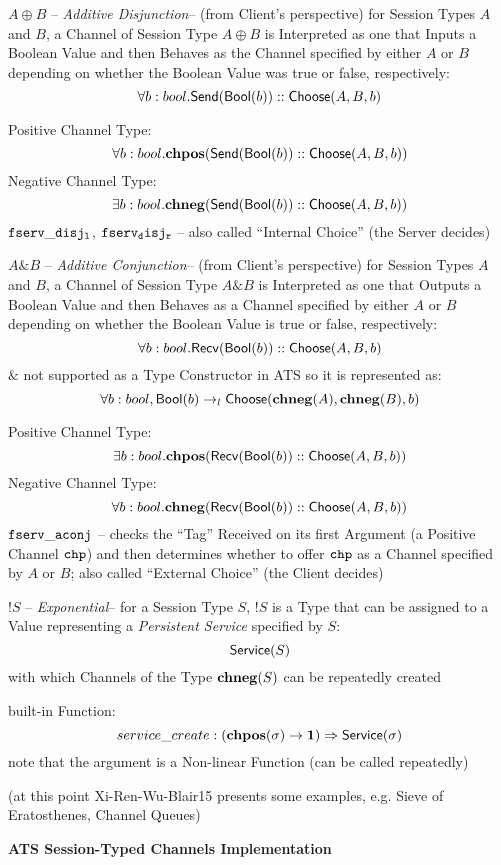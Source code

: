 $A \oplus B$ -- \emph{Additive Disjunction}-- (from Client's
perspective) for Session Types $A$ and $B$, a Channel of Session Type
$A \oplus B$ is Interpreted as one that Inputs a Boolean Value and
then Behaves as the Channel specified by either $A$ or $B$ depending
on whether the Boolean Value was true or false, respectively:
\[
  \forall b : bool. \mathsf{Send}(\mathsf{Bool}(b)) :: \mathsf{Choose}(A,B,b)
\]

Positive Channel Type:
\[
  \forall b : bool. \mathbf{chpos}(\mathsf{Send}(\mathsf{Bool}(b)) :: \mathsf{Choose}(A,B,b))
\]
Negative Channel Type:
\[
  \exists b : bool. \mathbf{chneg}(\mathsf{Send}(\mathsf{Bool}(b)) :: \mathsf{Choose}(A,B,b))
\]
$\mathtt{fserv\_disj_l}$, $\mathtt{fserv_disj_r}$ -- also called ``Internal
Choice'' (the Server decides)

$A \& B$ -- \emph{Additive Conjunction}-- (from Client's perspective)
for Session Types $A$ and $B$, a Channel of Session Type $A \& B$ is
Interpreted as one that Outputs a Boolean Value and then Behaves as a
Channel specified by either $A$ or $B$ depending on whether the
Boolean Value is true or false, respectively:
\[
  \forall b : bool. \mathsf{Recv}(\mathsf{Bool}(b)) :: \mathsf{Choose}(A,B,b)
\]
$\&$ not supported as a Type Constructor in ATS so it is represented
as:
\[
  \forall b:bool,
    \mathsf{Bool}(b) \rightarrow_l \mathsf{Choose}(\mathbf{chneg}(A), \mathbf{chneg}(B), b)
\]

Positive Channel Type:
\[
  \exists b : bool. \mathbf{chpos}(\mathsf{Recv}(\mathsf{Bool}(b)) :: \mathsf{Choose}(A,B,b))
\]
Negative Channel Type:
\[
  \forall b : bool. \mathbf{chneg}(\mathsf{Recv}(\mathsf{Bool}(b)) :: \mathsf{Choose}(A,B,b))
\]
$\mathtt{fserv\_aconj}$ -- checks the ``Tag'' Received on its first
Argument (a Positive Channel $\mathtt{chp}$) and then determines whether
to offer $\mathtt{chp}$ as a Channel specified by $A$ or $B$; also
called ``External Choice'' (the Client decides)

$!S$ -- \emph{Exponential}-- for a Session Type $S$, $!S$ is a Type
that can be assigned to a Value representing a \emph{Persistent
  Service} specified by $S$:
\[
  \mathsf{Service}(S)
\]
with which Channels of the Type $\mathbf{chneg}(S)$ can be repeatedly created

built-in Function:
\[
  service\_create :
    (\mathbf{chpos}(\sigma) \rightarrow \mathbf{1}) \Rightarrow \mathsf{Service}(\sigma)
\]
note that the argument is a Non-linear Function (can be called
repeatedly)

(at this point Xi-Ren-Wu-Blair15 presents some examples, e.g. Sieve of
Eratosthenes, Channel Queues)


\textbf{ATS Session-Typed Channels Implementation}

